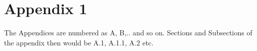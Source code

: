 \chapter{Appendix 1}
The Appendices are numbered as A, B,.. and so on. Sections and Subsections of the appendix then would be A.1, A.1.1, A.2 etc.  
